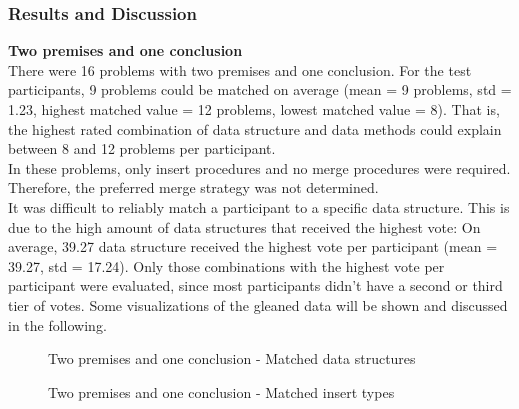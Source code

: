 \documentclass[hidelinks]{scrartcl}
\begin{document}
\subsubsection{Results and Discussion}
\textbf{Two premises and one conclusion} \\
There were 16 problems with two premises and one conclusion. For the test participants, 9 problems could be matched on average (mean = 9 problems, std = 1.23, highest matched value = 12 problems, lowest matched value = 8). That is, the highest rated combination of data structure and data methods could explain between 8 and 12 problems per participant. \\
In these problems, only insert procedures and no merge procedures were required. Therefore, the preferred merge strategy was not determined. \\
It was difficult to reliably match a participant to a specific data structure. This is due to the high amount of data structures that received the highest vote: On average, 39.27 data structure received the highest vote per participant (mean = 39.27, std = 17.24). Only those combinations with the highest vote per participant were evaluated, since most participants didn't have a second or third tier of votes. Some visualizations of the gleaned data will be shown and discussed in the following.

\begin{figure}[H]
	\caption{Two premises and one conclusion - Matched data structures}
	\label{img:exp2_3prem_data_structures}
	\begin{center}
	\end{center}
\end{figure}

\begin{figure}[H]
	\caption{Two premises and one conclusion - Matched insert types}
	\label{img:exp2_3prem_insert_types}
	\begin{center}
	\end{center}
\end{figure}
\end{document}
